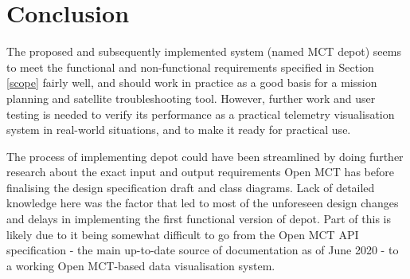 \begin{comment}

\end{comment}

\section{Conclusion}
The proposed and subsequently implemented system (named MCT \Gls{depot}) seems to meet the functional and non-functional requirements specified in Section \ref{scope} fairly well, and should work in practice as a good basis for a mission planning and satellite troubleshooting tool. However, further work and user testing is needed to verify its performance as a practical telemetry visualisation system in real-world situations, and to make it ready for practical use.

The process of implementing \Gls{depot} could have been streamlined by doing further research about the exact input and output requirements Open MCT has before finalising the design specification draft and class diagrams. Lack of detailed knowledge here was the factor that led to most of the unforeseen design changes and delays in implementing the first functional version of \Gls{depot}. Part of this is likely due to it being somewhat difficult to go from the Open MCT API specification - the main up-to-date source of documentation as of June 2020 - to a working Open MCT-based data visualisation system.



